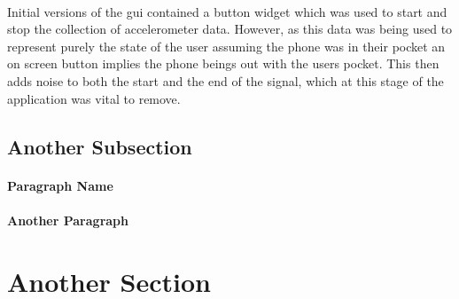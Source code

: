 \paragraph{}
Initial versions of the gui contained a button widget which was used to start and stop the collection of accelerometer data. However, as this data was being used to represent purely the state of the user  assuming the phone was in their pocket an on screen button implies the phone beings out with the users pocket. This then adds noise to both the start and the end of the signal, which at this stage of the application was vital to remove. 
\paragraph{}


\subsection{Another Subsection} %
\label{sub:another_subsection}

\paragraph{Paragraph Name} %
\label{par:paragraph_name}

\paragraph{Another Paragraph} %
\label{par:another_paragraph}

\section{Another Section} %
\label{sec:another_section}

